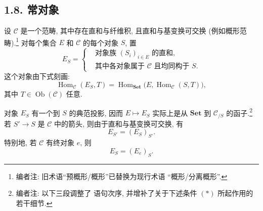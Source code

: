 
\subsection*{1.8. 常对象}

设 \(\mathscr C\) 是一个范畴, 其中存在直和与纤维积, 且直和与基变换可交换
(例如概形范畴).\footnote{编者注: 旧术语“预概形/概形”已替换为现行术语
“概形/分离概形”.} 对每个集合 \(E\) 和 \(\mathscr C\) 的每个对象 \(S\), 置
\begin{equation}
  \tag{1.8.1}\label{sga3:i:subsection:1-8:equation:1-8-1}
  E_S=
  \left\{
    \begin{aligned}
      &\text{对象族 }(S_i)_{i\in E}\text{ 的直和,}\\
      &\text{其中各对象属于 }\mathscr C\text{ 且均同构于 }S.
    \end{aligned}
  \right.
\end{equation}
这个对象由下式刻画:
\begin{equation}
  \tag{1.8.2}\label{sga3:i:subsection:1-8:equation:1-8-2}
  \operatorname{Hom}_{\mathscr C}(E_S,T)
  =\operatorname{Hom}_{\mathbf{Set}}
      \bigl(E,\operatorname{Hom}_{\mathscr C}(S,T)\bigr),
\end{equation}
其中 \(T\in\operatorname{Ob}(\mathscr C)\) 任意.

对象 \(E_S\) 有一个到 \(S\) 的典范投影, 因而 \(E\mapsto E_S\) 实际上是从
\(\mathbf{Set}\) 到 \(\mathscr C_{/S}\) 的函子.\footnote{编者注: 以下三段调整了
语句次序, 并增补了关于下述条件 \((*)\) 所起作用的若干细节.} 若 \(S'\to S\) 是
\(\mathscr C\) 中的箭头, 则由于直和与基变换可交换, 有
\[
  E_{S'}=(E_S)_{S'}.
\]
特别地, 若 \(\mathscr C\) 有终对象 \(e\), 则
\[
  E_S=(E_e)_S.
\]

